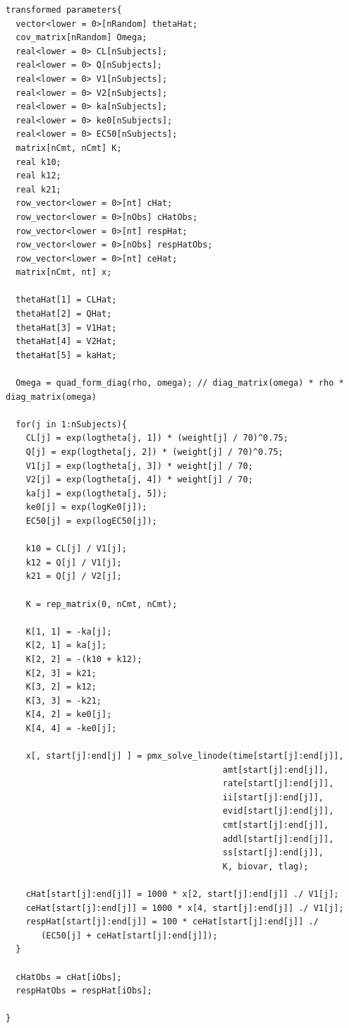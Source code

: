 \documentclass[10pt, reqno, oneside]{amsbook}
\numberwithin{equation}{chapter}
\numberwithin{figure}{chapter}
\numberwithin{table}{chapter}
\theoremstyle{remark}
\begin{document}
\begin{verbatim}
transformed parameters{
  vector<lower = 0>[nRandom] thetaHat;
  cov_matrix[nRandom] Omega;
  real<lower = 0> CL[nSubjects];
  real<lower = 0> Q[nSubjects];
  real<lower = 0> V1[nSubjects];
  real<lower = 0> V2[nSubjects];
  real<lower = 0> ka[nSubjects];
  real<lower = 0> ke0[nSubjects];
  real<lower = 0> EC50[nSubjects];
  matrix[nCmt, nCmt] K;
  real k10;
  real k12;
  real k21;
  row_vector<lower = 0>[nt] cHat;
  row_vector<lower = 0>[nObs] cHatObs;
  row_vector<lower = 0>[nt] respHat;
  row_vector<lower = 0>[nObs] respHatObs;
  row_vector<lower = 0>[nt] ceHat;
  matrix[nCmt, nt] x;

  thetaHat[1] = CLHat;
  thetaHat[2] = QHat;
  thetaHat[3] = V1Hat;
  thetaHat[4] = V2Hat;
  thetaHat[5] = kaHat;

  Omega = quad_form_diag(rho, omega); // diag_matrix(omega) * rho * diag_matrix(omega)

  for(j in 1:nSubjects){
    CL[j] = exp(logtheta[j, 1]) * (weight[j] / 70)^0.75;
    Q[j] = exp(logtheta[j, 2]) * (weight[j] / 70)^0.75;
    V1[j] = exp(logtheta[j, 3]) * weight[j] / 70;
    V2[j] = exp(logtheta[j, 4]) * weight[j] / 70;
    ka[j] = exp(logtheta[j, 5]);
    ke0[j] = exp(logKe0[j]);
    EC50[j] = exp(logEC50[j]);

    k10 = CL[j] / V1[j];
    k12 = Q[j] / V1[j];
    k21 = Q[j] / V2[j];

    K = rep_matrix(0, nCmt, nCmt);

    K[1, 1] = -ka[j];
    K[2, 1] = ka[j];
    K[2, 2] = -(k10 + k12);
    K[2, 3] = k21;
    K[3, 2] = k12;
    K[3, 3] = -k21;
    K[4, 2] = ke0[j];
    K[4, 4] = -ke0[j];

    x[, start[j]:end[j] ] = pmx_solve_linode(time[start[j]:end[j]],
                                           amt[start[j]:end[j]],
                                           rate[start[j]:end[j]],
                                           ii[start[j]:end[j]],
                                           evid[start[j]:end[j]],
                                           cmt[start[j]:end[j]],
                                           addl[start[j]:end[j]],
                                           ss[start[j]:end[j]],
                                           K, biovar, tlag);

    cHat[start[j]:end[j]] = 1000 * x[2, start[j]:end[j]] ./ V1[j];
    ceHat[start[j]:end[j]] = 1000 * x[4, start[j]:end[j]] ./ V1[j];
    respHat[start[j]:end[j]] = 100 * ceHat[start[j]:end[j]] ./ 
       (EC50[j] + ceHat[start[j]:end[j]]);
  }

  cHatObs = cHat[iObs];
  respHatObs = respHat[iObs];

}
\end{verbatim}
\end{document}
